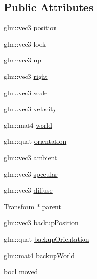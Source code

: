 \subsection*{Public Attributes}
\begin{DoxyCompactItemize}
\item 
glm\-::vec3 \hyperlink{class_b_g_e_1_1_transform_a6ed8b5c863f8194874bb7f67050ad733}{position}
\item 
glm\-::vec3 \hyperlink{class_b_g_e_1_1_transform_a26a45bbb5d264d4a6c1dce74c25e4b01}{look}
\item 
glm\-::vec3 \hyperlink{class_b_g_e_1_1_transform_ad728f83369928a7409b3c889113651b4}{up}
\item 
glm\-::vec3 \hyperlink{class_b_g_e_1_1_transform_a33fed54241b66010041f63193b920dd0}{right}
\item 
glm\-::vec3 \hyperlink{class_b_g_e_1_1_transform_ad788c54156f11fcfcd00946b7617a4ae}{scale}
\item 
glm\-::vec3 \hyperlink{class_b_g_e_1_1_transform_a202d73d14f1c9c756645cb75acfb72de}{velocity}
\item 
glm\-::mat4 \hyperlink{class_b_g_e_1_1_transform_a1111c3693593c94d9d559dab14070b8d}{world}
\item 
glm\-::quat \hyperlink{class_b_g_e_1_1_transform_a34cb89e882e27db3bc4b42364f9209d7}{orientation}
\item 
glm\-::vec3 \hyperlink{class_b_g_e_1_1_transform_a62b72900cf41dbeeebcc115c9ffba8e2}{ambient}
\item 
glm\-::vec3 \hyperlink{class_b_g_e_1_1_transform_a3b4fe0e657be15a4b9a4e768a5bd35d9}{specular}
\item 
glm\-::vec3 \hyperlink{class_b_g_e_1_1_transform_ae7028b3d27235e33ae62f36256e0d8ff}{diffuse}
\item 
\hyperlink{class_b_g_e_1_1_transform}{Transform} $\ast$ \hyperlink{class_b_g_e_1_1_transform_a37c5a64f2875db65e0af83ee507f547a}{parent}
\item 
glm\-::vec3 \hyperlink{class_b_g_e_1_1_transform_add53307b7b17e3f2003d23b0cd859408}{backup\-Position}
\item 
glm\-::quat \hyperlink{class_b_g_e_1_1_transform_ac1305552e0635ed07cf3e43ad898f038}{backup\-Orientation}
\item 
glm\-::mat4 \hyperlink{class_b_g_e_1_1_transform_a9eb76804ec98e5f22a3512a7c0393a8e}{backup\-World}
\item 
bool \hyperlink{class_b_g_e_1_1_transform_a7898a1ec8e3133d07f8961cb117697d9}{moved}
\end{DoxyCompactItemize}
